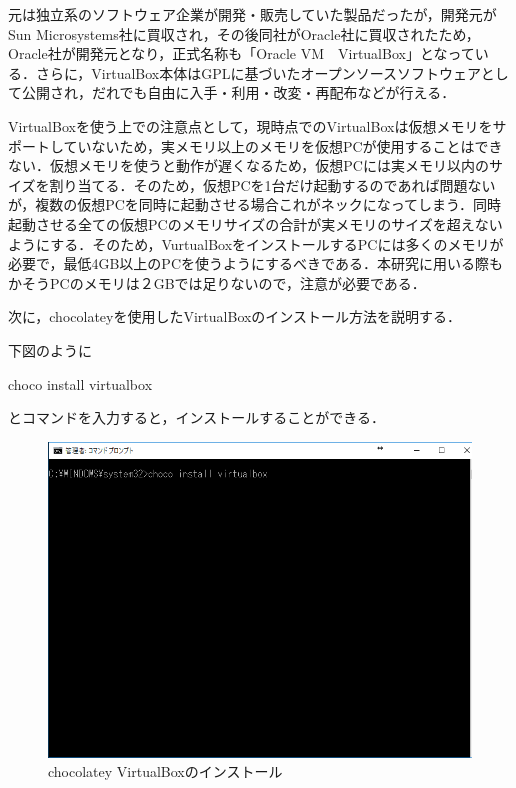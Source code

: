 元は独立系のソフトウェア企業が開発・販売していた製品だったが，開発元がSun Microsystems社に買収され，その後同社がOracle社に買収されたため，Oracle社が開発元となり，正式名称も「Oracle VM　VirtualBox」となっている．さらに，VirtualBox本体はGPLに基づいたオープンソースソフトウェアとして公開され，だれでも自由に入手・利用・改変・再配布などが行える．

VirtualBoxを使う上での注意点として，現時点でのVirtualBoxは仮想メモリをサポートしていないため，実メモリ以上のメモリを仮想PCが使用することはできない．仮想メモリを使うと動作が遅くなるため，仮想PCには実メモリ以内のサイズを割り当てる．そのため，仮想PCを1台だけ起動するのであれば問題ないが，複数の仮想PCを同時に起動させる場合これがネックになってしまう．同時起動させる全ての仮想PCのメモリサイズの合計が実メモリのサイズを超えないようにする．そのため，VurtualBoxをインストールするPCには多くのメモリが必要で，最低4GB以上のPCを使うようにするべきである．本研究に用いる際もかそうPCのメモリは２GBでは足りないので，注意が必要である．
\newpage

次に，chocolateyを使用したVirtualBoxのインストール方法を説明する．

下図のように

choco install virtualbox

とコマンドを入力すると，インストールすることができる．

\begin{figure}[htb]
\centering
\includegraphics[width=13cm]{4-6.png}
\caption{chocolatey VirtualBoxのインストール}\label{4-6}
\end{figure}
\newpage

